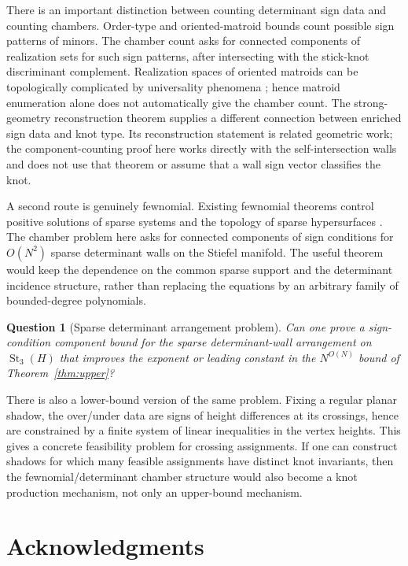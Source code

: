 \documentclass[11pt]{article}
\theoremstyle{remark}
\theoremstyle{plain}
\newtheorem{question}{Question}
\DeclareMathOperator{\St}{St}
\begin{document}
There is an important distinction between counting determinant sign data and
counting chambers.  Order-type and oriented-matroid bounds count possible sign
patterns of minors.  The chamber count asks for connected components of
realization sets for such sign patterns, after intersecting with the stick-knot
discriminant complement.  Realization spaces of oriented matroids can be
topologically complicated by universality phenomena \cite{Mnev,RichterGebert};
hence matroid enumeration alone does not automatically give the chamber count.
The strong-geometry reconstruction theorem \cite{GrosRamirez} supplies a
different connection between enriched sign data and knot type.  Its
reconstruction statement is related geometric work; the component-counting
proof here works directly with the self-intersection walls and does not use
that theorem or assume that a wall sign vector classifies the knot.

A second route is genuinely fewnomial.  Existing fewnomial theorems control
positive solutions of sparse systems and the topology of sparse hypersurfaces
\cite{KhovanskiiFewnomials,BihanSottileFewnomial,BihanRojasSottile,
BihanSottileBetti}.  The chamber problem here asks for connected components of
sign conditions for \(O(N^2)\) sparse determinant walls on the Stiefel manifold.
The useful theorem would keep the dependence on the common sparse support and
the determinant incidence structure, rather than replacing the equations by an
arbitrary family of bounded-degree polynomials.

\begin{question}[Sparse determinant arrangement problem]
Can one prove a sign-condition component bound for the sparse determinant-wall
arrangement on \(\St_3(H)\) that improves the exponent or leading constant in
the \(N^{O(N)}\) bound of Theorem~\ref{thm:upper}?
\end{question}

There is also a lower-bound version of the same problem.  Fixing a regular
planar shadow, the over/under data are signs of height differences at its
crossings, hence are constrained by a finite system of linear inequalities in
the vertex heights.  This gives a concrete feasibility problem for crossing
assignments.  If one can construct shadows for which many feasible assignments
have distinct knot invariants, then the fewnomial/determinant chamber structure
would also become a knot production mechanism, not only an upper-bound
mechanism.

\section*{Acknowledgments}
\end{document}
